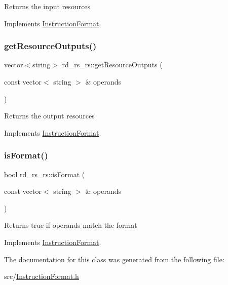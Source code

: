 Returns the input resources 

Implements \hyperlink{classInstructionFormat_a09775d3a3c22f40a0f44504664e586e4}{Instruction\+Format}.

\mbox{\label{classrd__rs__rs_ae2fd5d87f3db344ce4f8cea452ef6913}} 
\subsubsection{\texorpdfstring{get\+Resource\+Outputs()}{getResourceOutputs()}}
{\footnotesize\ttfamily vector$<$string$>$ rd\+\_\+rs\+\_\+rs\+::get\+Resource\+Outputs (\begin{DoxyParamCaption}\item[{const vector$<$ string $>$ \&}]{operands }\end{DoxyParamCaption})\hspace{0.3cm}{\ttfamily [virtual]}}

Returns the output resources 

Implements \hyperlink{classInstructionFormat_a95cd28ffb1bde59b67f676880ab10536}{Instruction\+Format}.

\mbox{\label{classrd__rs__rs_a9f92e9d08e1cc714507225a0fd961aba}} 
\subsubsection{\texorpdfstring{is\+Format()}{isFormat()}}
{\footnotesize\ttfamily bool rd\+\_\+rs\+\_\+rs\+::is\+Format (\begin{DoxyParamCaption}\item[{const vector$<$ string $>$ \&}]{operands }\end{DoxyParamCaption})\hspace{0.3cm}{\ttfamily [virtual]}}

Returns true if operands match the format 

Implements \hyperlink{classInstructionFormat_a9fdcf94dcd7d9a55ba86e7a63f04d1fe}{Instruction\+Format}.



The documentation for this class was generated from the following file\+:\begin{DoxyCompactItemize}
\item 
src/\hyperlink{InstructionFormat_8h}{Instruction\+Format.\+h}\end{DoxyCompactItemize}
